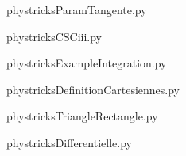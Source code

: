     \newcommand{\CaptionFigParamTangente}{<+Type your caption here+>}
    \begin{center}
        
    \end{center}
    phystricksParamTangente.py

    

    \clearpage
    


    \newcommand{\CaptionFigCSCiii}{<+Type your caption here+>}
    \begin{center}
        
    \end{center}
    phystricksCSCiii.py

    

    \clearpage
    


    \newcommand{\CaptionFigExampleIntegration}{<+Type your caption here+>}
    \begin{center}
        
    \end{center}
    phystricksExampleIntegration.py

    

    \clearpage
    


    \newcommand{\CaptionFigDefinitionCartesiennes}{<+Type your caption here+>}
    \begin{center}
        
    \end{center}
    phystricksDefinitionCartesiennes.py

    

    \clearpage
    


    \newcommand{\CaptionFigTriangleRectangle}{<+Type your caption here+>}
    \begin{center}
        
    \end{center}
    phystricksTriangleRectangle.py

    

    \clearpage
    


    \newcommand{\CaptionFigDifferentielle}{<+Type your caption here+>}
    \begin{center}
        
    \end{center}
    phystricksDifferentielle.py

